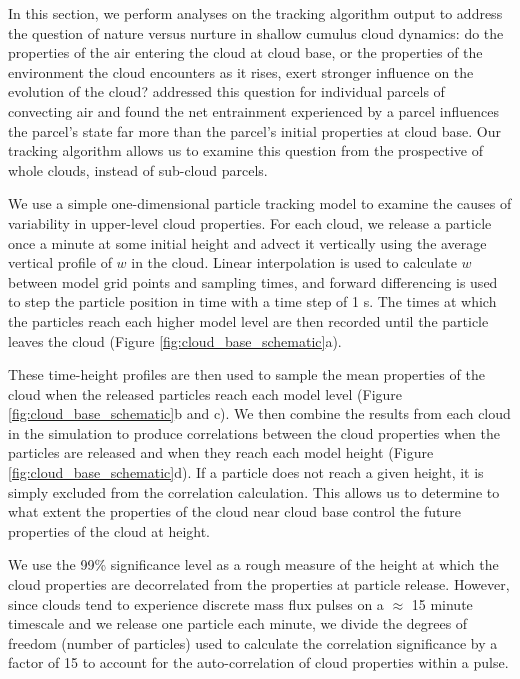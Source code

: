 \documentclass[acp]{copernicus}
\begin{document}
In this section, we perform analyses on the tracking algorithm output to 
address the question of nature versus nurture in shallow cumulus cloud 
dynamics: do the properties of the air entering the cloud at cloud base, or the 
properties of the environment the cloud encounters as it rises, exert stronger 
influence on the evolution of the cloud?  \cite{Romps2010a} addressed this 
question for individual parcels of convecting air and found the net entrainment 
experienced by a parcel influences the parcel's state far more than the 
parcel's initial properties at cloud base.  Our tracking algorithm allows us to 
examine this question from the prospective of whole clouds, instead of 
sub-cloud parcels.

We use a simple one-dimensional particle tracking model to examine the causes 
of variability in upper-level cloud properties.  For each cloud, we release a 
particle once a minute at some initial height and advect it vertically using 
the average vertical profile of $w$ in the cloud.  Linear interpolation is 
used to calculate $w$ between model grid points and sampling times, and forward 
differencing is used to step the particle position in time with a time step of 
1 s.  The times at which the particles reach each higher model level are then 
recorded until the particle leaves the cloud (Figure 
\ref{fig:cloud_base_schematic}a).  

These time-height profiles are then used to sample the mean properties of the 
cloud when the released particles reach each model level (Figure 
\ref{fig:cloud_base_schematic}b and c).  We then combine the results from each 
cloud in the simulation to produce correlations between the cloud properties 
when the particles are released and when they reach each model height (Figure 
\ref{fig:cloud_base_schematic}d).  If a particle does not reach a given 
height, it is simply excluded from the correlation calculation.  This allows us 
to determine to what extent the properties of the cloud near cloud base control 
the future properties of the cloud at height.

We use the 99\% significance level as a rough measure of the height at which 
the cloud properties are decorrelated from the properties at particle release.  
However, since clouds tend to experience discrete mass flux pulses on a 
$\approx$ 15 minute timescale and we release one particle each minute, we 
divide the degrees of freedom (number of particles) used to calculate the 
correlation significance by a factor of 15 to account for the auto-correlation 
of cloud properties within a pulse.
\end{document}
